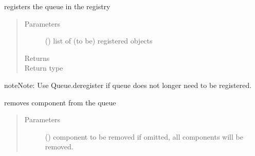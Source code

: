 \documentclass[letterpaper,10pt,english]{sphinxmanual}
\begin{document}
\begin{fulllineitems}
\begin{fulllineitems}
\end{fulllineitems}


\begin{fulllineitems}
\label{\detokenize{Reference:salabim.Queue.register}}
registers the queue in the registry
\begin{quote}\begin{description}
\item[{Parameters}] \leavevmode
{} () \textendash{} list of (to be) registered objects

\item[{Returns}] \leavevmode
{}

\item[{Return type}] \leavevmode
{\hyperref[\detokenize{Reference:salabim.Queue}]{}}

\end{description}\end{quote}

\begin{sphinxadmonition}{note}{Note:}
Use Queue.deregister if queue does not longer need to be registered.
\end{sphinxadmonition}

\end{fulllineitems}


\begin{fulllineitems}
\label{\detokenize{Reference:salabim.Queue.remove}}
removes component from the queue
\begin{quote}\begin{description}
\item[{Parameters}] \leavevmode
{} ({\hyperref[\detokenize{Reference:salabim.Component}]{}}) \textendash{} component to be removed 
if omitted, all components will be removed.

\end{description}\end{quote}


\end{fulllineitems}
\end{fulllineitems}
\end{document}
